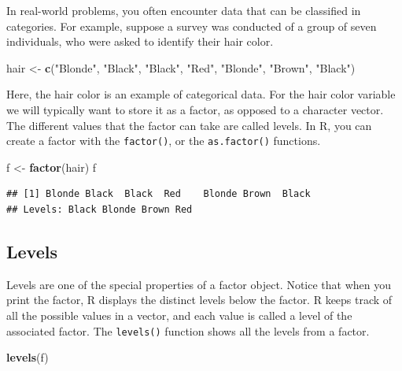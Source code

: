 \documentclass[
]{book}
\newenvironment{Shaded}{\begin{snugshade}}{\end{snugshade}}
\newcommand{\KeywordTok}[1]{\textcolor[rgb]{0.13,0.29,0.53}{\textbf{#1}}}
\newcommand{\NormalTok}[1]{#1}
\newcommand{\StringTok}[1]{\textcolor[rgb]{0.31,0.60,0.02}{#1}}
\begin{document}
In real-world problems, you often encounter data that can be classified in categories. For example, suppose a survey was conducted of a group of seven individuals, who were asked to identify their hair color.

\begin{Shaded}
\begin{Highlighting}[]
\NormalTok{hair <-}\StringTok{ }\KeywordTok{c}\NormalTok{(}\StringTok{"Blonde"}\NormalTok{, }\StringTok{"Black"}\NormalTok{, }\StringTok{"Black"}\NormalTok{, }\StringTok{"Red"}\NormalTok{, }\StringTok{"Blonde"}\NormalTok{, }\StringTok{"Brown"}\NormalTok{,}
    \StringTok{"Black"}\NormalTok{)}
\end{Highlighting}
\end{Shaded}

Here, the hair color is an example of categorical data. For the hair color variable we will typically want to store it as a factor, as opposed to a character vector. The different values that the factor can take are called levels. In R, you can create a factor with the \texttt{factor()}, or the \texttt{as.factor()} functions.

\begin{Shaded}
\begin{Highlighting}[]
\NormalTok{f <-}\StringTok{ }\KeywordTok{factor}\NormalTok{(hair)}
\NormalTok{f}
\end{Highlighting}
\end{Shaded}

\begin{verbatim}
## [1] Blonde Black  Black  Red    Blonde Brown  Black 
## Levels: Black Blonde Brown Red
\end{verbatim}

\hypertarget{levels}{%
\subsection{Levels}\label{levels}}

Levels are one of the special properties of a factor object. Notice that when you print the factor, R displays the distinct levels below the factor. R keeps track of all the possible values in a vector, and each value is called a level of the associated factor. The \texttt{levels()} function shows all the levels from a factor.

\begin{Shaded}
\begin{Highlighting}[]
\KeywordTok{levels}\NormalTok{(f)}
\end{Highlighting}
\end{Shaded}
\end{document}
